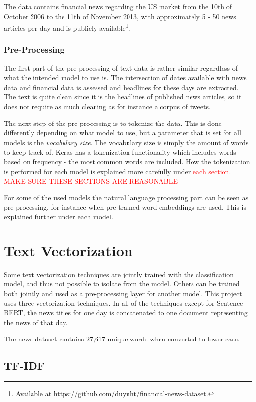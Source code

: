 The data contains financial news regarding the US market from the 10th of October 2006 to the 11th of November 2013, with approximately 5 - 50 news articles per day and is publicly available\footnote{Available at \url{https://github.com/duynht/financial-news-dataset}.}.

\subsubsection*{Pre-Processing}

The first part of the pre-processing of text data is rather similar regardless of what the intended model to use is. The intersection of dates available with news data and financial data is assessed and headlines for these days are extracted. The text is quite clean since it is the headlines of published news articles, so it does not require as much cleaning as for instance a corpus of tweets. 

The next step of the pre-processing is to tokenize the data. This is done differently depending on what model to use, but a parameter that is set for all models is the \textit{vocabulary size}. The vocabulary size is simply the amount of words to keep track of. Keras has a tokenization functionality which includes words based on frequency - the most common words are included. How the tokenization is performed for each model is explained more carefully under \textcolor{red}{each section. MAKE SURE THESE SECTIONS ARE REASONABLE} 

For some of the used models the natural language processing part can be seen as pre-processing, for instance when pre-trained word embeddings are used. This is explained further under each model.

\section{Text Vectorization}
Some text vectorization techniques are jointly trained with the classification model, and thus not possible to isolate from the model. Others can be trained both jointly and used as a pre-processing layer for another model. This project uses three vectorization techniques. In all of the techniques except for Sentence-BERT, the news titles for one day is concatenated to one document representing the news of that day. 

The news dataset contains 27,617 unique words when converted to lower case. 

\subsection{TF-IDF}

